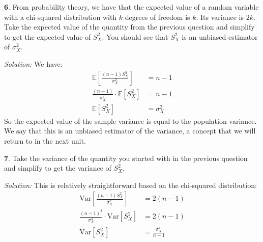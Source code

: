 \documentclass{tufte-handout}
\newcommand{\E}{\mathbb{E}}
\newcommand{\V}{\text{Var}}
\begin{document}
\textbf{6}. From probability theory, we have that the expected value of a random variable with
a chi-squared distribution with $k$ degrees of freedom is $k$. Its variance is $2k$.
Take the expected value of the quantity from the previous question and
simplify to get the expected value of $S_X^2$. You should see that $S_X^2$ is
an unbiased estimator of $\sigma_X^2$.

\textit{Solution:} We have:
\begin{align*}
\E \left[ \frac{(n-1) S_X^2}{\sigma_X^2} \right] &= n-1 \\
\frac{(n-1)}{\sigma_X^2} \cdot \E \left[ S_X^2 \right] &= n-1 \\
\E \left[ S_X^2 \right] &= \sigma_X^2
\end{align*}
So the expected value of the sample variance is equal to the population variance.
We say that this is an unbiased estimator of the variance, a concept that we will
return to in the next unit.

\textbf{7}. Take the
variance of the quantity you started with in the previous question and simplify
to get the variance of $S_X^2$.

\textit{Solution:} This is relatively straightforward based on the chi-squared distribution:
\begin{align*}
\V \left[ \frac{(n-1) S_X^2}{\sigma_X^2} \right] &= 2(n-1) \\
\frac{(n-1)^2}{\sigma_X^4} \cdot \V \left[ S_X^2 \right] &= 2(n-1) \\
\V \left[ S_X^2 \right] &= \frac{\sigma_X^4}{n-1}
\end{align*}
\end{document}
